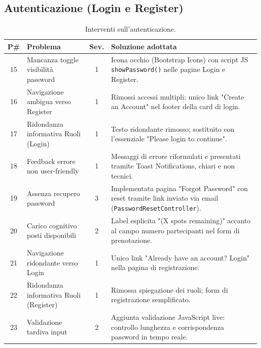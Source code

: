 \subsection{Autenticazione (Login e Register)}

\begin{table}[H]
\centering
\renewcommand{\arraystretch}{1.4}
\small
\begin{tabularx}{\textwidth}{|c|X|c|X|}
\hline
\textbf{P\#} & \textbf{Problema} & \textbf{Sev.} & \textbf{Soluzione adottata} \\ \hline
15 & Mancanza toggle visibilità password  & 1 & Icona occhio (Bootstrap Icons) con script JS \texttt{showPassword()} nelle pagine Login e Register. \\ \hline
16 & Navigazione ambigua verso Register   & 1 & Rimossi accessi multipli; unico link "Create an Account" nel footer della card di login. \\ \hline
17 & Ridondanza informativa Ruoli (Login) & 1 & Testo ridondante rimosso; sostituito con l'essenziale "Please login to continue". \\ \hline
18 & Feedback errore non user-friendly    & 1 & Messaggi di errore riformulati e presentati tramite Toast Notifications, chiari e non tecnici. \\ \hline
19 & Assenza recupero password            & 3 & Implementata pagina "Forgot Password" con reset tramite link inviato via email (\texttt{PasswordResetController}). \\ \hline
20 & Carico cognitivo posti disponibili   & 2 & Label esplicita "(X spots remaining)" accanto al campo numero partecipanti nel form di prenotazione. \\ \hline
21 & Navigazione ridondante verso Login   & 1 & Unico link "Already have an account? Login" nella pagina di registrazione. \\ \hline
22 & Ridondanza informativa Ruoli (Register) & 1 & Rimossa spiegazione dei ruoli; form di registrazione semplificato. \\ \hline
23 & Validazione tardiva input            & 2 & Aggiunta validazione JavaScript live: controllo lunghezza e corrispondenza password in tempo reale. \\ \hline
\end{tabularx}
\caption{Interventi sull'autenticazione.}
\label{tab:fix_auth}
\end{table}

